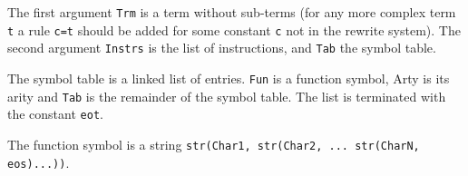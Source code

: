 \documentclass[11pt,twoside]{memoir}
\def\T{\texttt}
\begin{document}
\begin{description}[style=nextline,align=myparleft]
	\item[\T{job(Trm,Instrs,Tab)}] 
		The first argument \T{Trm} is a term without sub-terms (for any more complex term \T{t} a rule \T{c=t} should be added for some constant \T{c} not in the rewrite system).
		The second argument \T{Instrs} is the list of instructions, and \T{Tab} the symbol table.
	\item[\T{tab(Fun, Arty, Tab)}\\
	\T{eot}]
		The symbol table is a linked list of entries. \T{Fun} is a function symbol, Arty is its arity and \T{Tab} is the remainder of the symbol table. The list is terminated with the constant \T{eot}.
		
		The function symbol is a string \T{str(Char1, str(Char2, ... str(CharN, eos)...))}.
		

\end{description}
\end{document}
